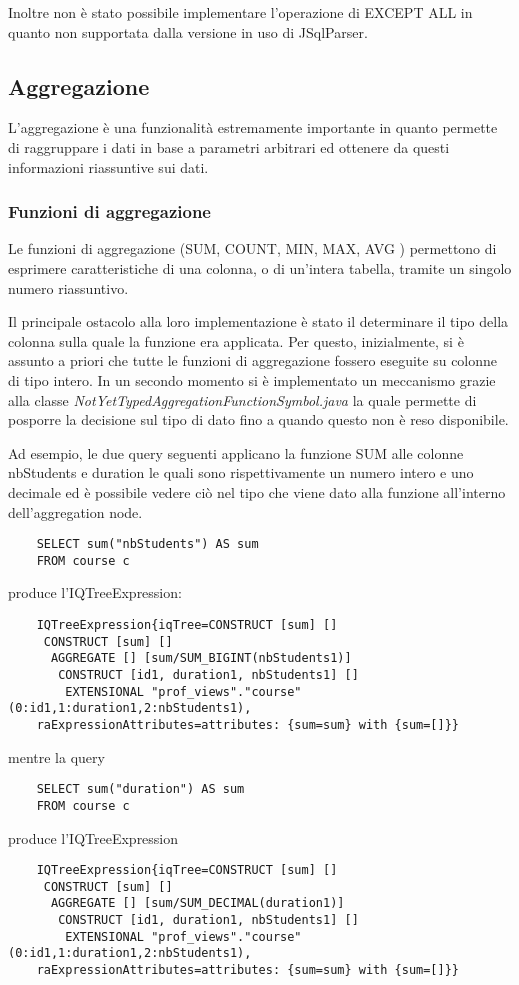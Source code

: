 Inoltre non è stato possibile implementare l'operazione di EXCEPT ALL in quanto non supportata dalla versione in uso di JSqlParser.

\subsection{Aggregazione}
L'aggregazione è una funzionalità estremamente importante in quanto permette di raggruppare i dati in base a parametri arbitrari ed
ottenere da questi informazioni riassuntive sui dati.
\subsubsection*{Funzioni di aggregazione}
Le funzioni di aggregazione (SUM, COUNT, MIN, MAX, AVG ) permettono di esprimere caratteristiche di una colonna, o di un'intera tabella,
tramite un singolo numero riassuntivo.

Il principale ostacolo alla loro implementazione è stato il determinare il tipo della colonna sulla quale la funzione era applicata.
Per questo, inizialmente, si è assunto a priori che tutte le funzioni di aggregazione fossero eseguite su colonne di tipo intero. In un
secondo momento si è implementato un meccanismo grazie alla classe
\textit{NotYetTypedAggregationFunctionSymbol.java} la quale permette di posporre la decisione sul tipo di dato fino a quando questo non è
reso disponibile.

Ad esempio, le due query seguenti applicano la funzione SUM alle colonne nbStudents e duration le quali sono rispettivamente un numero intero
e uno decimale ed è possibile vedere ciò nel tipo che viene dato alla funzione all'interno dell'aggregation node.
\begin{verbatim}
    SELECT sum("nbStudents") AS sum
    FROM course c 
\end{verbatim}
produce l'IQTreeExpression:
\begin{verbatim}
    IQTreeExpression{iqTree=CONSTRUCT [sum] []
     CONSTRUCT [sum] []
      AGGREGATE [] [sum/SUM_BIGINT(nbStudents1)]
       CONSTRUCT [id1, duration1, nbStudents1] []
        EXTENSIONAL "prof_views"."course"(0:id1,1:duration1,2:nbStudents1),
    raExpressionAttributes=attributes: {sum=sum} with {sum=[]}}
\end{verbatim}
mentre la query
\begin{verbatim}
    SELECT sum("duration") AS sum
    FROM course c 
\end{verbatim}
produce l'IQTreeExpression
\begin{verbatim}
    IQTreeExpression{iqTree=CONSTRUCT [sum] []
     CONSTRUCT [sum] []
      AGGREGATE [] [sum/SUM_DECIMAL(duration1)]
       CONSTRUCT [id1, duration1, nbStudents1] []
        EXTENSIONAL "prof_views"."course"(0:id1,1:duration1,2:nbStudents1),
    raExpressionAttributes=attributes: {sum=sum} with {sum=[]}}    
\end{verbatim}


